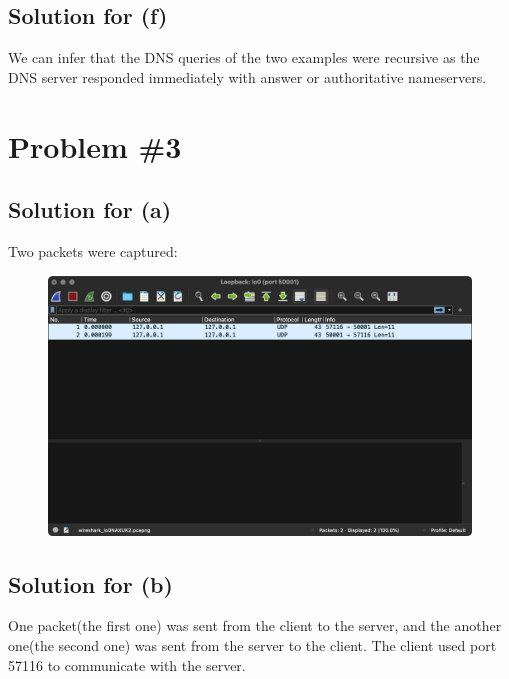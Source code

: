 \documentclass{scrartcl}
\begin{document}
\subsection{Solution for (f)}
We can infer that the DNS queries of the two examples were recursive as the DNS
server responded immediately with answer or authoritative nameservers.

\section{Problem \#3}

\subsection{Solution for (a)}
Two packets were captured:

\begin{figure}[H]
  \centering
  \includegraphics[width=0.8\linewidth]{prob3a}
\end{figure}

\subsection{Solution for (b)}
One packet(the first one) was sent from the client to the server, and the
another one(the second one) was sent from the server to the client. The client
used port 57116 to communicate with the server.
\end{document}
